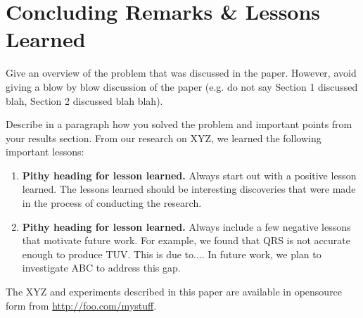 \section{Concluding Remarks \& Lessons Learned}
\label{conclusion}

Give an overview of the problem that was discussed in the
paper. However, avoid giving a blow by blow
discussion of the paper (e.g. do not say
Section 1 discussed blah, Section 2 discussed
blah blah). 

Describe in a paragraph how you solved the problem
and important points from your results section.
From our research on XYZ, we learned the following
important lessons:

\begin{enumerate}

\item \textbf{Pithy heading for lesson learned.} Always
start out with a positive lesson learned. The lessons
learned should be interesting discoveries that were
made in the process of conducting the research. 

\item \textbf{Pithy heading for lesson learned.} Always
include a few negative lessons that motivate future
work. For example, we found that QRS is not accurate
enough to produce TUV. This is due to.... In future
work, we plan to investigate ABC to address this gap.

\end{enumerate}

The XYZ and experiments described in this paper are available in 
opensource form from \url{http://foo.com/mystuff}.